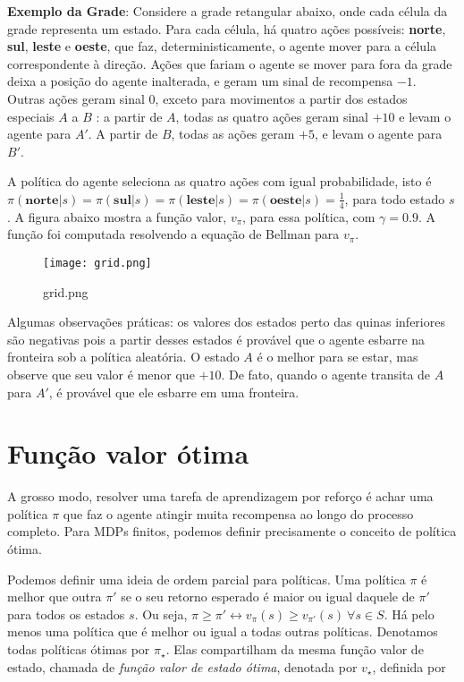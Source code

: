 \documentclass{article}
\begin{document}
\textbf{Exemplo da Grade}: Considere a grade retangular abaixo, onde cada célula da grade representa um estado. Para cada célula, há quatro ações possíveis: \textbf{norte}, \textbf{sul}, \textbf{leste} e \textbf{oeste}, que faz, deterministicamente, o agente mover para a célula correspondente à direção. Ações que fariam o agente se mover para fora da grade deixa a posição do agente inalterada, e geram um sinal de recompensa $-1$. Outras ações geram sinal $0$, exceto para movimentos a partir dos estados especiais $A$ a $B$ : a partir de $A$, todas as quatro ações geram sinal $+10$ e levam o agente para $A'$. A partir de $B$, todas as ações geram $+5$, e levam o agente para $B'$.

A política do agente seleciona as quatro ações com igual probabilidade, isto é $\pi(\textbf{norte}|s)=\pi(\textbf{sul}|s)=\pi(\textbf{leste}|s)=\pi(\textbf{oeste}|s)= \frac{1}{4}$, para todo estado $s$. A figura abaixo mostra a função valor, $v_{\pi}$, para essa política, com $\gamma=0.9$. A função foi computada resolvendo a equação de Bellman para  $v_{\pi}$.

\begin{figure}[htpb]
  \centering
  \texttt{[image: grid.png]}
  \caption{grid.png}
  \label{fig:grid-png}
\end{figure}

Algumas observações práticas: os valores dos estados perto das quinas inferiores são negativas pois a partir desses estados é provável que o agente esbarre na fronteira sob a política aleatória. O estado $A$ é o melhor para se estar, mas observe que seu valor é menor que $+10$. De fato, quando o agente transita de $A$ para $A'$, é provável que ele esbarre em uma fronteira. 


\section{Função valor ótima}

A grosso modo, resolver uma tarefa de aprendizagem por reforço é achar uma política $\pi$ que faz o agente atingir muita recompensa ao longo do processo completo. Para MDPs finitos, podemos definir precisamente o conceito de política ótima. 

Podemos definir uma ideia de ordem parcial para políticas. Uma política $\pi$ é melhor que outra $\pi'$ se o seu retorno esperado é maior ou igual daquele de $\pi'$ para todos os estados $s$. Ou seja, $\pi \ge \pi' \leftrightarrow v_{\pi}(s) \ge v_{\pi'}(s)\ \forall s \in S$. Há pelo menos uma política que é melhor ou igual a todas outras políticas. Denotamos todas políticas ótimas por $\pi_{\star}$. Elas compartilham da mesma função valor de estado, chamada de \textit{função valor de estado ótima}, denotada por $v_{\star}$, definida por
\end{document}
